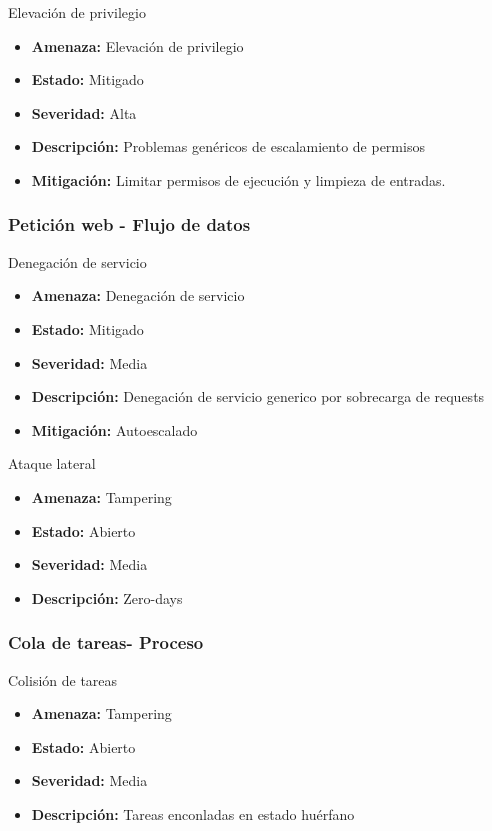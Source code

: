 Elevación de privilegio
\begin{itemize}
    \item \textbf{Amenaza: } Elevación de privilegio
    \item \textbf{Estado: } Mitigado
    \item \textbf{Severidad: } Alta
    \item \textbf{Descripción: } Problemas genéricos de escalamiento de permisos
    \item \textbf{Mitigación: } Limitar permisos de ejecución y limpieza de entradas.
\end{itemize}


\subsubsection{Petición web - Flujo de datos}
Denegación de servicio
\begin{itemize}
    \item \textbf{Amenaza: } Denegación de servicio
    \item \textbf{Estado: } Mitigado
    \item \textbf{Severidad: } Media
    \item \textbf{Descripción: } Denegación de servicio generico por sobrecarga de requests
    \item \textbf{Mitigación: } Autoescalado
\end{itemize}

Ataque lateral
\begin{itemize}
    \item \textbf{Amenaza: } Tampering
    \item \textbf{Estado: } Abierto
    \item \textbf{Severidad: } Media
    \item \textbf{Descripción: } Zero-days
\end{itemize}


\subsubsection{Cola de tareas- Proceso}
Colisión de tareas
\begin{itemize}
    \item \textbf{Amenaza: } Tampering
    \item \textbf{Estado: } Abierto
    \item \textbf{Severidad: } Media
    \item \textbf{Descripción: } Tareas enconladas en estado huérfano
\end{itemize}

